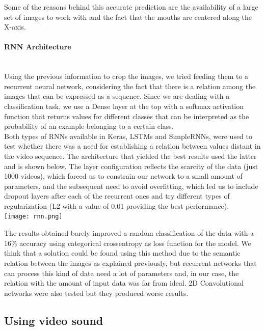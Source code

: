 \documentclass{article}[10pt]
\begin{document}
\begin{multicols}{2}
Some of the reasons behind this accurate prediction are the availability of a
large set of images to work with and the fact that the mouths are centered along
the X-axis.

\paragraph{RNN Architecture} ~\\

Using the previous information to crop the images, we tried feeding them to a
recurrent neural network, considering the fact that there is a relation among the
images that can be expressed as a sequence.  Since we are dealing with a
classification task, we use a Dense layer at the top with a softmax activation
function that returns values for different classes that can be interpreted
as the probability of an example belonging to a certain class.\\

Both types of RNNs available in Keras, LSTMs and SimpleRNNs, were used to test
whether there was a need for establishing a relation between values distant in
the video sequence. The architecture that yielded the best results used the
latter and is shown below. The layer configuration reflects the scarcity of
the data (just 1000 videos), which forced us to constrain our network to a small
amount of parameters, and the subsequent need to avoid overfitting, which led us
to include dropout layers after each of the recurrent ones and try different
types of regularization (L2 with a value of 0.01 providing the best
performance).\\

\texttt{[image: rnn.png]}


The results obtained barely improved a random classification of the data with a
16\% accuracy using categorical crossentropy as loss function for the model. We
think that a solution could be found using this method due to the semantic
relation between the images as explained previously, but recurrent networks that
can process this kind of data need a lot of parameters and, in our case, the
relation with the amount of input data was far from ideal. 2D Convolutional
networks were also tested but they produced worse results.

\subsection{Using video sound}


\end{multicols}
\end{document}
